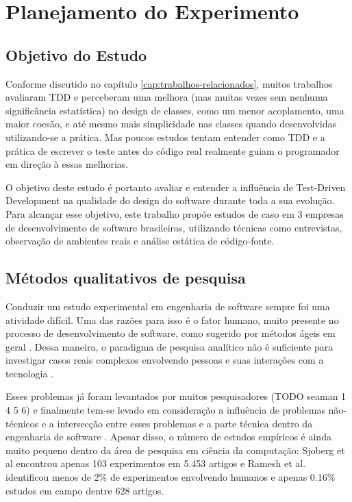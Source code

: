 \chapter{Planejamento do Experimento}
\label{cap:planejamento}

\section{Objetivo do Estudo} 
\label{sec:planejamento-proposito}

Conforme discutido no capítulo \ref{cap:trabalhos-relacionados}, muitos trabalhos avaliaram TDD e
perceberam uma melhora (mas muitas vezes sem nenhuma significância estatística) no design de classes,
como um menor acoplamento, uma maior coesão, e até mesmo mais simplicidade nas classes quando desenvolvidas
utilizando-se a prática. Mas poucos estudos tentam entender como TDD e a prática de escrever o teste antes do código real
realmente guiam o programador em direção à essas melhorias.

O objetivo deste estudo é portanto avaliar e entender a influência de Test-Driven Development na qualidade do 
design do software durante toda a sua evolução. Para alcançar esse objetivo, 
este trabalho propõe estudos de caso em 3 empresas de desenvolvimento de software brasileiras,
utilizando técnicas como entrevistas, observação de ambientes reais e análise estática de código-fonte.

\section{Métodos qualitativos de pesquisa} 
\label{sec:planejamento-qualitativa}

Conduzir um estudo experimental em engenharia de software sempre foi uma atividade difícil. Uma das razões para isso é o
fator humano, muito presente no processo de desenvolvimento de software, como sugerido por métodos ágeis em geral \cite{AgileManifesto}. 
Dessa maneira, o paradigma de pesquisa analítico não é suficiente para investigar casos reais complexos envolvendo pessoas
e suas interações com a tecnologia \cite{guidelines-case-study}.

Esses problemas já foram levantados por muitos pesquisadores (TODO seaman 1 4 5 6) e finalmente tem-se 
levado em consideração a influência de problemas não-técnicos e a intersecção entre esses problemas e a parte técnica 
dentro da engenharia de software \cite{seaman}.
Apesar disso, o número de estudos empíricos é ainda muito pequeno dentro da área de pesquisa em ciência da computação: 
Sjoberg et al \cite{sjoberg} encontrou apenas 103 experimentos em 5.453 artigos e Ramesh et al. \cite{ramesh} 
identificou menos de 2\% de experimentos envolvendo humanos e apenas 0.16\% estudos em campo dentre 628 artigos.

